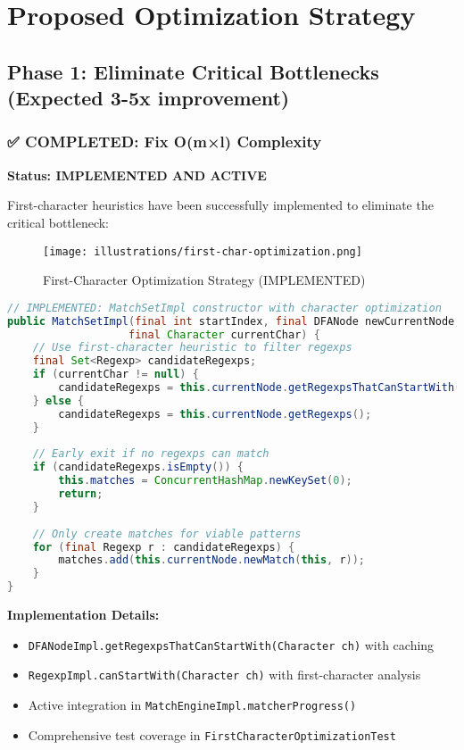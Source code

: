 \documentclass[11pt,a4paper]{article}
\begin{document}
\section{Proposed Optimization Strategy}

\subsection{Phase 1: Eliminate Critical Bottlenecks (Expected 3-5x improvement)}

\subsubsection{✅ COMPLETED: Fix O(m×l) Complexity}

\textbf{Status: IMPLEMENTED AND ACTIVE}

First-character heuristics have been successfully implemented to eliminate the critical bottleneck:

\begin{figure}[htbp]
\centering
\texttt{[image: illustrations/first-char-optimization.png]}
\caption{First-Character Optimization Strategy (IMPLEMENTED)}
\label{fig:first-char}
\end{figure}

\begin{lstlisting}[language=Java,caption=Implemented first-character optimization]
// IMPLEMENTED: MatchSetImpl constructor with character optimization
public MatchSetImpl(final int startIndex, final DFANode newCurrentNode, 
                   final Character currentChar) {
    // Use first-character heuristic to filter regexps
    final Set<Regexp> candidateRegexps;
    if (currentChar != null) {
        candidateRegexps = this.currentNode.getRegexpsThatCanStartWith(currentChar);
    } else {
        candidateRegexps = this.currentNode.getRegexps();
    }
    
    // Early exit if no regexps can match
    if (candidateRegexps.isEmpty()) {
        this.matches = ConcurrentHashMap.newKeySet(0);
        return;
    }
    
    // Only create matches for viable patterns
    for (final Regexp r : candidateRegexps) {
        matches.add(this.currentNode.newMatch(this, r));
    }
}
\end{lstlisting}

\textbf{Implementation Details:}
\begin{itemize}
\item \texttt{DFANodeImpl.getRegexpsThatCanStartWith(Character ch)} with caching
\item \texttt{RegexpImpl.canStartWith(Character ch)} with first-character analysis  
\item Active integration in \texttt{MatchEngineImpl.matcherProgress()}
\item Comprehensive test coverage in \texttt{FirstCharacterOptimizationTest}
\end{itemize}
\end{document}
